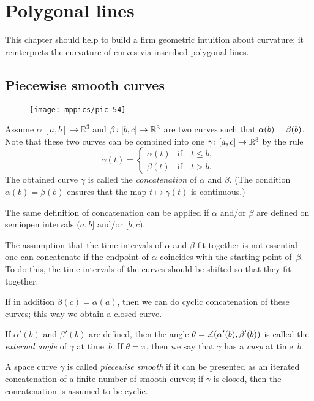 \chapter{Polygonal lines}
\label{chap:poly}

This chapter should help to build a firm geometric intuition about curvature;
it reinterprets the curvature of curves via inscribed polygonal lines.

\section{Piecewise smooth curves}

\begin{wrapfigure}{o}{25 mm}
\vskip-0mm
\centering
\texttt{[image: mppics/pic-54]}
\end{wrapfigure}

Assume $\alpha\:[a,b]\to \mathbb{R}^3$ and $\beta\:[b,c]\z\to \mathbb{R}^3$ are two curves such that $\alpha(b)\z=\beta(b)$.
Note that these two curves can be combined into one $\gamma\:[a,c]\z\to \mathbb{R}^3$ by the rule 
\[\gamma(t)=
\begin{cases}
\alpha(t)&\text{if}\quad t\le b,
\\
\beta(t)&\text{if}\quad t> b.
\end{cases}
\]
The obtained curve $\gamma$ is called the 
\emph{concatenation} of $\alpha$ and $\beta$.
(The condition $\alpha(b)=\beta(b)$ ensures that the map $t\mapsto\gamma(t)$ is continuous.)

The same definition of concatenation can be applied if $\alpha$ and/or $\beta$ are defined on semiopen intervals 
$(a,b]$ and/or $[b,c)$.

The assumption that the time intervals of $\alpha$ and $\beta$ fit together is not essential --- one can concatenate if the endpoint of $\alpha$ coincides with the starting point of~$\beta$.
To do this, the time intervals of the curves should be shifted so that they fit together. 

If in addition $\beta(c)=\alpha(a)$, then we can do cyclic concatenation of these curves;
this way we obtain a closed curve.

If $\alpha'(b)$ and $\beta'(b)$ are defined, then the angle $\theta\z=\measuredangle(\alpha'(b),\beta'(b))$ is called the \emph{external angle} of $\gamma$ at time~$b$.
If $\theta=\pi$, then we say that $\gamma$ has a \emph{cusp} at  time~$b$.

A space curve $\gamma$ is called \emph{piecewise smooth} if it can be presented as an iterated concatenation of a finite number of smooth curves; if $\gamma$ is closed, then the  concatenation is assumed to be cyclic.

